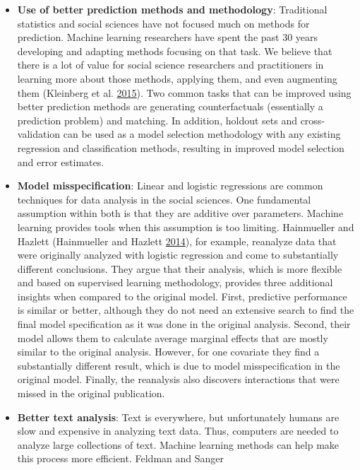 \documentclass[]{krantz}
\begin{document}
\begin{itemize}
\item
  \textbf{Use of better prediction methods and methodology}: Traditional
  statistics and social sciences have not focused much on methods for
  prediction. Machine learning researchers have spent the past 30 years
  developing and adapting methods focusing on that task. We believe that
  there is a lot of value for social science researchers and
  practitioners in learning more about those methods, applying them, and
  even augmenting them (Kleinberg et al.
  \protect\hyperlink{ref-Kleinberg2015}{2015}). Two common tasks that
  can be improved using better prediction methods are generating
  counterfactuals (essentially a prediction problem) and matching. In
  addition, holdout sets and cross-validation can be used as a model
  selection methodology with any existing regression and classification
  methods, resulting in improved model selection and error estimates.
\item
  \textbf{Model misspecification}: Linear and logistic regressions are
  common techniques for data analysis in the social sciences. One
  fundamental assumption within both is that they are additive over
  parameters. Machine learning provides tools when this assumption is
  too limiting. Hainmueller and Hazlett (Hainmueller and Hazlett
  \protect\hyperlink{ref-hainmueller2014kernel}{2014}), for example,
  reanalyze data that were originally analyzed with logistic regression
  and come to substantially different conclusions. They argue that their
  analysis, which is more flexible and based on supervised learning
  methodology, provides three additional insights when compared to the
  original model. First, predictive performance is similar or better,
  although they do not need an extensive search to find the final model
  specification as it was done in the original analysis. Second, their
  model allows them to calculate average marginal effects that are
  mostly similar to the original analysis. However, for one covariate
  they find a substantially different result, which is due to model
  misspecification in the original model. Finally, the reanalysis also
  discovers interactions that were missed in the original publication.
\item
  \textbf{Better text analysis}: Text is everywhere, but unfortunately
  humans are slow and expensive in analyzing text data. Thus, computers
  are needed to analyze large collections of text. Machine learning
  methods can help make this process more efficient. Feldman and Sanger

\end{itemize}
\end{document}
